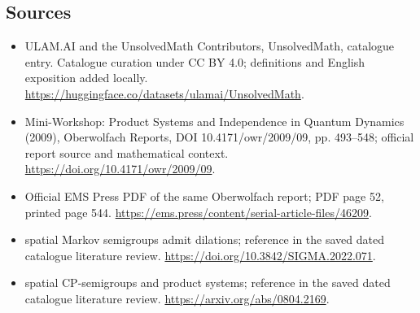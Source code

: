 \documentclass[11pt]{article}
\begin{document}
\subsection{Sources}
\begin{itemize}
\item[\hypertarget{source:statement:1}{S1}] ULAM.AI and the UnsolvedMath Contributors, UnsolvedMath, catalogue entry. Catalogue curation under CC BY 4.0; definitions and English exposition added locally.
\url{https://huggingface.co/datasets/ulamai/UnsolvedMath}.
\item[\hypertarget{source:statement:2}{S2}] Mini-Workshop: Product Systems and Independence in Quantum Dynamics (2009), Oberwolfach Reports, DOI 10.4171/owr/2009/09, pp. 493--548; official report source and mathematical context.
\url{https://doi.org/10.4171/owr/2009/09}.
\item[\hypertarget{source:statement:3}{S3}] Official EMS Press PDF of the same Oberwolfach report; PDF page 52, printed page 544.
\url{https://ems.press/content/serial-article-files/46209}.
\item[\hypertarget{source:statement:4}{S4}] spatial Markov semigroups admit dilations; reference in the saved dated catalogue literature review.
\url{https://doi.org/10.3842/SIGMA.2022.071}.
\item[\hypertarget{source:statement:5}{S5}] spatial CP-semigroups and product systems; reference in the saved dated catalogue literature review.
\url{https://arxiv.org/abs/0804.2169}.
\end{itemize}
\label{end:statement}
\end{document}
